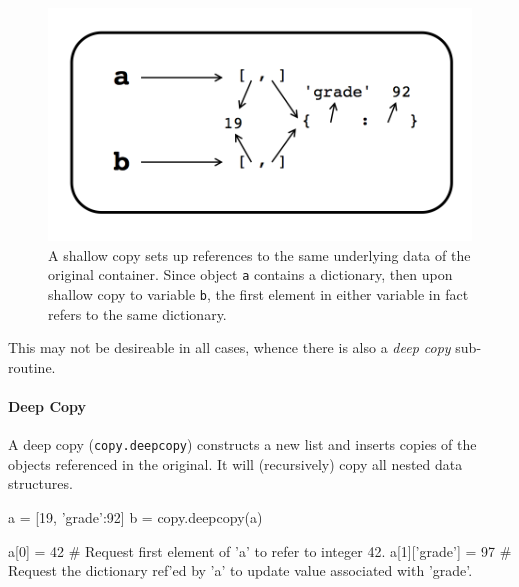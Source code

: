 \documentclass[12pt,letterpaper,twoside]{article}
\begin{document}
\begin{figure}[h]
\centering
\includegraphics[scale=0.35]{fig/shallow-copy-mutables.png}
\caption{A shallow copy sets up references to the same underlying data of the original container. Since object \texttt{a} contains a dictionary,
then upon shallow copy to variable \texttt{b}, the first element in either variable in fact refers to the same dictionary.}
\end{figure}

This may not be desireable in all cases, whence there is also a \emph{deep copy} sub-routine.

\paragraph{Deep Copy} A deep copy (\texttt{copy.deepcopy}) constructs a new list and inserts
copies of the objects referenced in the original. It will (recursively) copy all
nested data structures. 

\begin{python}
a = [19, {'grade':92}]
b = copy.deepcopy(a)

a[0] = 42           # Request first element of 'a' to refer to integer 42.
a[1]['grade'] = 97  # Request the dictionary ref'ed by 'a' to update value associated with 'grade'. 
\end{python}
\end{document}
